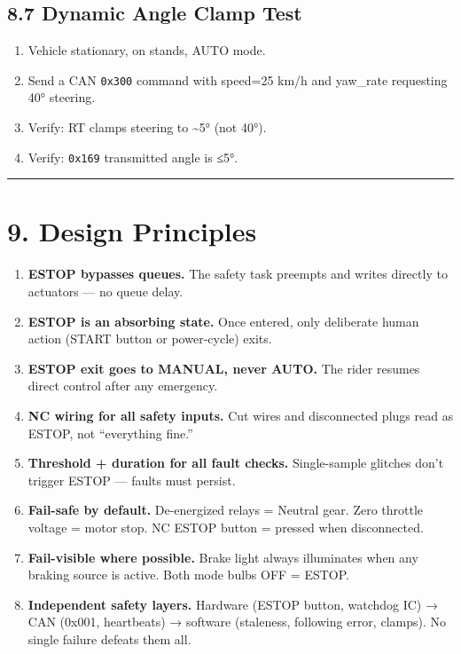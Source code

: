 \documentclass[12pt,a4paper,oneside]{report}
\providecommand{\tightlist}{\setlength{\itemsep}{0pt}\setlength{\parskip}{0pt}}
\begin{document}
\subsection{8.7 Dynamic Angle Clamp Test}\label{dynamic-angle-clamp-test}

\begin{enumerate}
\def\labelenumi{\arabic{enumi}.}
\tightlist
\item
  Vehicle stationary, on stands, AUTO mode.
\item
  Send a CAN \texttt{0x300} command with speed=25 km/h and yaw\_rate requesting
  40° steering.
\item
  Verify: RT clamps steering to \textasciitilde5° (not 40°).
\item
  Verify: \texttt{0x169} transmitted angle is ≤5°.
\end{enumerate}

\begin{center}\rule{0.5\linewidth}{0.5pt}\end{center}

\section{9. Design Principles}\label{design-principles}

\begin{enumerate}
\def\labelenumi{\arabic{enumi}.}
\tightlist
\item
  \textbf{ESTOP bypasses queues.} The safety task preempts and writes directly
  to actuators --- no queue delay.
\item
  \textbf{ESTOP is an absorbing state.} Once entered, only deliberate human
  action (START button or power-cycle) exits.
\item
  \textbf{ESTOP exit goes to MANUAL, never AUTO.} The rider resumes direct
  control after any emergency.
\item
  \textbf{NC wiring for all safety inputs.} Cut wires and disconnected plugs
  read as ESTOP, not ``everything fine.''
\item
  \textbf{Threshold + duration for all fault checks.} Single-sample glitches
  don't trigger ESTOP --- faults must persist.
\item
  \textbf{Fail-safe by default.} De-energized relays = Neutral gear. Zero
  throttle voltage = motor stop. NC ESTOP button = pressed when disconnected.
\item
  \textbf{Fail-visible where possible.} Brake light always illuminates when any
  braking source is active. Both mode bulbs OFF = ESTOP.
\item
  \textbf{Independent safety layers.} Hardware (ESTOP button, watchdog IC) → CAN
  (0x001, heartbeats) → software (staleness, following error, clamps). No single
  failure defeats them all.
\end{enumerate}
\end{document}
